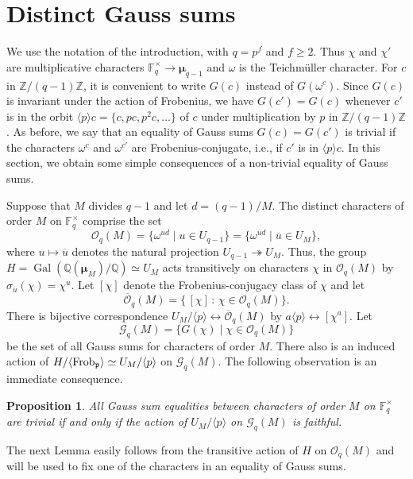 \documentclass[12pt]{amsart}  \usepackage{amsmath,amssymb,enumerate,amscd,tikz,url}
\numberwithin{equation}{section}
\newtheorem{prop}[equation]{Proposition}
\theoremstyle{definition}
\newcommand{\F}{{\mathbb F}}
\newcommand{\Q}{{\mathbb Q}}
\newcommand{\Z}{{\mathbb Z}}
\newcommand{\Mu}{\boldsymbol \mu}
\newcommand{\gp}{{\mathfrak p}}
\newcommand{\cG}{{\mathcal G}}
\newcommand{\cO}{{\mathcal O}}
\newcommand{\Gal}{\operatorname{Gal}}
\newcommand{\Frob}{{\rm Frob}}
\newcommand{\lr}[1]{{\langle {#1} \rangle}}
\newcommand{\ov}[1]{\overline{#1}}
\begin{document}
\section{Distinct Gauss sums} \label{DistinctionResults}
We use the notation of the introduction, with $q = p^f$ and $f \ge 2$.  Thus  $\chi$ and $\chi'$ are multiplicative characters $\F_q^\times \to \Mu_{q-1}$ and $\omega$ is the Teichm\"{u}ller character.   For $c$ in $\Z/(q-1)\Z$, it is convenient to write $G(c)$ instead of $G(\omega^c)$.  Since $G(c)$ is invariant under the action of Frobenius, we have $G(c') = G(c)$ whenever $c'$ is in the orbit $\lr{p}c = \{c, pc, p^2c, \dots\}$ of $c$ under multiplication by $p$ in $\Z/(q-1)\Z$.  As before, we say that an equality of Gauss sums $G(c) = G(c')$ is trivial if the characters $\omega^c$ and $\omega^{c'}$ are Frobenius-conjugate, i.e., if $c'$ is in $\lr{p}c$.   In this section, we obtain some simple consequences of a non-trivial equality of Gauss sums.

Suppose that $M$ divides $q-1$ and let $d = (q-1)/M$.  The distinct characters of order $M$ on $\F_q^\times$ comprise the set
$$
\cO_q(M) = \{ \omega^{u d} \mid u \in U_{q-1} \} =  \{\omega^{\ov{u} d} \mid \ov{u} \in U_M\},
$$
where $u \mapsto \ov{u}$ denotes the natural projection $U_{q-1} \twoheadrightarrow U_M$.  Thus, the group $H =  \Gal(\Q(\Mu_M)/\Q) \simeq U_M$ acts transitively on characters $\chi$ in $\cO_q(M)$ by $\sigma_u(\chi) = \chi^u$.  Let $[\chi]$ denote the Frobenius-conjugacy class of $\chi$ and let 
\begin{equation} \label{Obar}
\ov{\cO}_q(M) = \{\, [\chi] \, : \,  \chi \in \cO_q(M) \}.
\end{equation}
There is bijective correspondence $U_M/\lr{p} \leftrightarrow \ov{\cO}_q(M)$ by $a \lr{p} \leftrightarrow [\chi^a]$.   Let 
$$
\cG_q(M) = \{G(\chi) \mid \chi \in \cO_q(M)\}
$$ 
be the set of all Gauss sums for characters of order $M$.  There also is an induced action of $H/\lr{\Frob_\gp} \simeq U_M/\lr{p}$ on $\cG_q(M)$.  The following observation is an immediate consequence.

\begin{prop} \label{faithful}
All Gauss sum equalities between characters of order $M$ on $\F_q^\times$ are trivial if and only if the action of $U_M/\lr{p}$ on $\cG_q(M)$ is faithful. 
\end{prop}

The next Lemma easily follows from the transitive action of $H$ on $\cO_q(M)$ and will be used to fix one of the characters in an equality of Gauss sums.  
\end{document}
